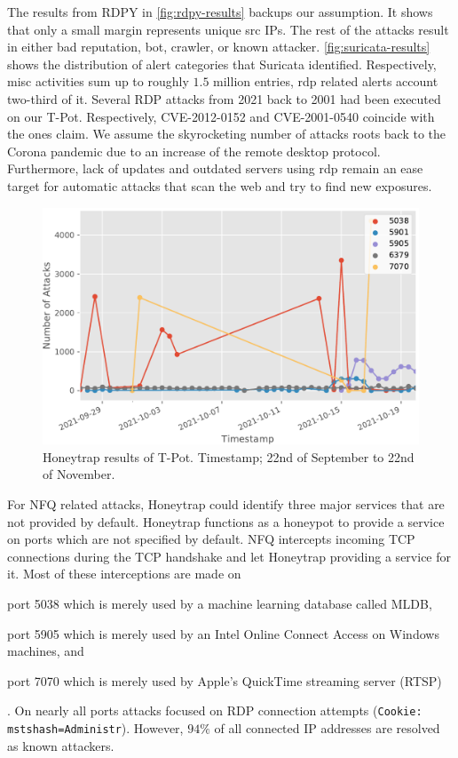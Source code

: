 The results from RDPY in \autoref{fig:rdpy-results} backups our assumption.
It shows that only a small margin represents unique src IPs.
The rest of the attacks result in either bad reputation, bot, crawler, or known attacker.
\autoref{fig:suricata-results} shows the distribution of alert categories that Suricata identified.
Respectively, misc activities sum up to roughly $1.5$ million entries, \ac{rdp} related alerts account two-third of it.
Several RDP attacks from 2021 back to 2001 had been executed on our T-Pot.
Respectively, CVE-2012-0152 and CVE-2001-0540 coincide with the ones \citet{Kelly2021} claim.
We assume the skyrocketing number of attacks roots back to the Corona pandemic due to an increase of the remote desktop protocol.
Furthermore, lack of updates and outdated servers using \ac{rdp} remain an ease target for automatic attacks that scan the web and try to find new exposures.

\begin{figure}[ht]
    \centering
    \includegraphics[width=\textwidth]{figures/tpot-honeytrap-port.pdf}
    \caption[Honeytrap results of T-Pot]{Honeytrap results of T-Pot. Timestamp; 22nd of September to 22nd of November.}
    \label{fig:honeytrap-results}
\end{figure}

For NFQ related attacks, Honeytrap could identify three major services that are not provided by default.
Honeytrap functions as a honeypot to provide a service on ports which are not specified by default.
NFQ intercepts incoming TCP connections during the TCP handshake and let Honeytrap providing a service for it.
Most of these interceptions are made on
\begin{enumerate*}[label=(\roman*)]
    \item port 5038 which is merely used by a machine learning database called MLDB,
    \item port 5905 which is merely used by an Intel Online Connect Access on Windows machines, and
    \item port 7070 which is merely used by Apple's QuickTime streaming server (RTSP)
\end{enumerate*}.
On nearly all ports attacks focused on RDP connection attempts (\verb|Cookie: mstshash=Administr|).
However, $94\%$ of all connected IP addresses are resolved as known attackers.

